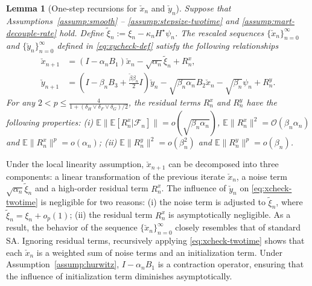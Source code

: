 \documentclass[11pt]{article}
\theoremstyle{plain}
\newtheorem{lem}{Lemma}[section]
\theoremstyle{definition}
\def\Hsmooth{{\delta_H}}
\def\Fsmooth{{\delta_F}}
\def\Gsmooth{{\delta_G}}
\def\invdiffslow{\tilde{\beta}}
\def\mI{{\bm{I}}}
\def\FM{{\mathcal F}}
\def\OM{{\mathcal O}}
\def\EB{{\mathbb E}}
\newcommand{\xcheck}{{\check{x}}}
\newcommand{\ycheck}{{\check{y}}}
\newcommand{\zcheck}{{\check{z}}}
\def\mI{{I}}
\begin{document}
\begin{lem}[One-step recursions for $\xcheck_{n}$ and $\ycheck_{n}$]\label{lem:check-twotime-xy}
	Suppose that Assumptions~\ref{assump:smooth} -- \ref{assump:stepsize-twotime} and \ref{assump:mart-decouple-rate} hold.
	Define $\tilde{\xi}_{n} := \xi_{n} - \kappa_{n} H^\star \psi_{n}$. 
	The rescaled sequences $\{ \xcheck_{n} \}_{n=0}^\infty$ and $\{ \ycheck_{n} \}_{n=0}^\infty$ defined in \eqref{eq:xycheck-def} 
	satisfy the following relationships  
	\begin{align}
		\xcheck_{n+1} & = (\mI - \alpha_{n} B_1) \xcheck_{n} - \sqrt{\alpha_{n}} \tilde{\xi}_{n} + R_{n}^x, \label{eq:xcheck-twotime} \\
		\ycheck_{n+1}
		& = \left( \mI - \beta_{n} B_3 + \frac{ \invdiffslow \beta_{n} }{2} \mI \right) \ycheck_{n} - \sqrt{\beta_{n} \alpha_{n} } B_2 \xcheck_{n} - \sqrt{\beta_n} \psi_{n} + R_{n}^y. \label{eq:ycheck-twotime}
	\end{align}
	For any $2 < p \le \frac{4}{1 + ( \Hsmooth \vee \Fsmooth \vee \Gsmooth )/2} $, 
	the residual terms $R_{n}^x$ and $R_{n}^y$ 
	have the following properties:
		(i) $\EB \| \EB [ R_{n}^x | \FM_n ] \| = o(\sqrt{\beta_{n} \alpha_{n}}) $, $\EB \| R_{n}^x \|^2 = \OM(\beta_{n} \alpha_{n})$ and $\EB \| R_{n}^x \|^p = o(\alpha_{n})$;
		(ii) $\EB \| R_{n}^y \|^2 = o(\beta_{n}^2)$ and $\EB \| R_{n}^y \|^p = o(\beta_{n})$.
\end{lem}

Under the local linearity assumption, $\xcheck_{n+1}$ can be decomposed into three components: a linear transformation of the previous iterate $\xcheck_{n}$,
a noise term $\sqrt{\alpha_{n}} \tilde{\xi}_{n}$ and a high-order residual term $R_n^x$.
The influence of $\ycheck_{n}$ on \eqref{eq:xcheck-twotime} is negligible for two reasons: (i) the noise term is adjusted to $\tilde{\xi}_{n}$, where $\tilde{\xi}_{n} = \xi_{n} + o_p(1)$; (ii) the residual term $R_n^x$ is asymptotically negligible.
As a result, the behavior of the sequence $\{ 
\xcheck_{n} \}_{n=0}^\infty$ closely resembles that of standard SA.
Ignoring residual terms, recursively applying \eqref{eq:xcheck-twotime} shows that each $\xcheck_{n}$ is a weighted sum of noise terms and an initialization term.
Under Assumption~\ref{assump:hurwitz}, $\mI - \alpha_{n} B_1$ is a contraction operator, ensuring that the influence of initialization term diminishes asymptotically.
\end{document}
